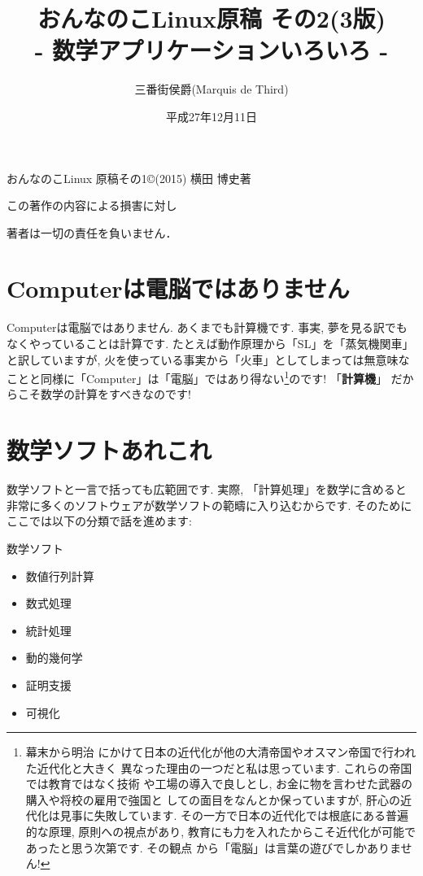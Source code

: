 \documentclass[b5j,8pt,twocolumn]{ltjsarticle}
\title{おんなのこLinux原稿 その2(3版)\\
- 数学アプリケーションいろいろ -}
\author{三番街侯爵(Marquis de Third)}
\date{
平成27年12月11日
 }
\begin{document}
\maketitle

\vspace{10cm}

おんなのこLinux 原稿その1\copyright (2015) 横田 博史著\par

この著作の内容による損害に対し

著者は一切の責任を負いません．
\clearpage
\newpage
\setcounter{page}{1}

\section{Computerは電脳ではありません}

Computerは電脳ではありません. あくまでも計算機です. 事実, 夢を見る訳でも
なくやっていることは計算です. たとえば動作原理から「SL」を「蒸気機関車」
と訳していますが, 火を使っている事実から「火車」としてしまっては無意味な
ことと同様に「Computer」は「電脳」ではあり得ない\footnote{幕末から明治
にかけて日本の近代化が他の大清帝国やオスマン帝国で行われた近代化と大きく
異なった理由の一つだと私は思っています. これらの帝国では教育ではなく技術
や工場の導入で良しとし, お金に物を言わせた武器の購入や将校の雇用で強国と
しての面目をなんとか保っていますが, 肝心の近代化は見事に失敗しています.
 その一方で日本の近代化では根底にある普遍的な原理, 原則への視点があり,
 教育にも力を入れたからこそ近代化が可能であったと思う次第です. その観点
から「電脳」は言葉の遊びでしかありません!}のです! 「\textbf{計算機}」
だからこそ数学の計算をすべきなのです! 

\section{数学ソフトあれこれ}

数学ソフトと一言で括っても広範囲です. 実際, 「計算処理」を数学に含めると
非常に多くのソフトウェアが数学ソフトの範疇に入り込むからです. そのために
ここでは以下の分類で話を進めます:

\vspace{0.2cm}
\begin{itembox}[c]{数学ソフト}
\begin{itemize}
\item{数値行列計算}
\item{数式処理}
\item{統計処理}
\item{動的幾何学}
\item{証明支援}
\item{可視化}
\end{itemize}
\end{itembox}
\end{document}
